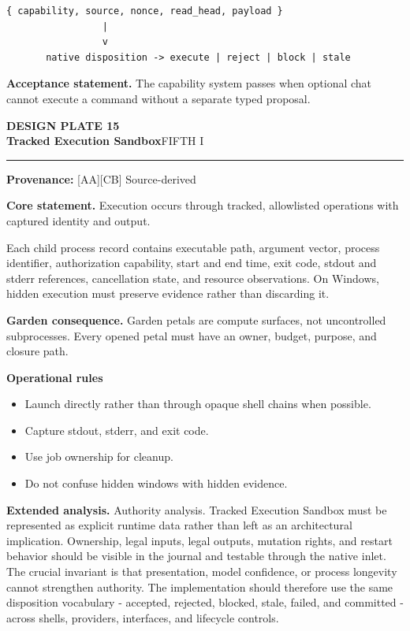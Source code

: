 \documentclass[10pt,letterpaper,oneside]{article}
\newcommand{\prov}[1]{\textcolor{gardenBlue}{\sffamily\footnotesize\textbf{Provenance:} #1}}
\newcommand{\platetitle}[3]{%
  \begin{minipage}[t][0.54in][t]{\textwidth}
  {\sffamily\bfseries\color{gardenDeep}\fontsize{9}{10}\selectfont DESIGN PLATE #1}\\[-1pt]
  {\sffamily\bfseries\color{gardenInk}\fontsize{16.5}{18}\selectfont #2}\hfill{\sffamily\color{gardenGreen}\large #3}
  \end{minipage}\vspace{-2pt}\hrule\vspace{5pt}}
\begin{document}
\begin{lstlisting}
{ capability, source, nonce, read_head, payload }
                 |
                 v
       native disposition -> execute | reject | block | stale
\end{lstlisting}
\begin{acceptbox}
\textbf{Acceptance statement.} The capability system passes when optional chat cannot execute a command without a separate typed proposal.
\end{acceptbox}
\newpage
\platetitle{15}{Tracked Execution Sandbox}{FIFTH I}
\prov{[AA][CB] Source-derived}
\fontsize{8.85}{10.45}\selectfont
\begin{corebox}
\textbf{Core statement.} Execution occurs through tracked, allowlisted operations with captured identity and output.
\end{corebox}
Each child process record contains executable path, argument vector, process identifier, authorization capability, start and end time, exit code, stdout and stderr references, cancellation state, and resource observations. On Windows, hidden execution must preserve evidence rather than discarding it.

\textbf{Garden consequence.} Garden petals are compute surfaces, not uncontrolled subprocesses. Every opened petal must have an owner, budget, purpose, and closure path.

\textbf{Operational rules}
\begin{itemize}
\item Launch directly rather than through opaque shell chains when possible.
\item Capture stdout, stderr, and exit code.
\item Use job ownership for cleanup.
\item Do not confuse hidden windows with hidden evidence.
\end{itemize}
\textbf{Extended analysis.} Authority analysis. Tracked Execution Sandbox must be represented as explicit runtime data rather than left as an architectural implication. Ownership, legal inputs, legal outputs, mutation rights, and restart behavior should be visible in the journal and testable through the native inlet. The crucial invariant is that presentation, model confidence, or process longevity cannot strengthen authority. The implementation should therefore use the same disposition vocabulary - accepted, rejected, blocked, stale, failed, and committed - across shells, providers, interfaces, and lifecycle controls.
\end{document}

